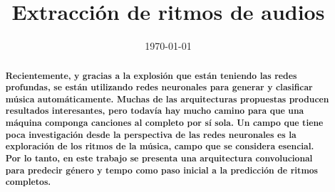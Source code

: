 \documentclass{etilo_tfm_iuta}  %
\begin{document}
\frontmatter
\title      {Extracción de ritmos de audios}
\date       {\today}
\subject    {}
\keywords   {}
\maketitle
\begin{abstract}
\bf \small	
Recientemente, y gracias a la explosión que están teniendo las redes profundas, se están utilizando redes neuronales para generar y clasificar música automáticamente. Muchas de las arquitecturas propuestas producen resultados interesantes, pero todavía hay mucho camino para que una máquina componga canciones al completo por sí sola. Un campo que tiene poca investigación desde la perspectiva de las redes neuronales es la exploración de los ritmos de la música, campo que se considera esencial. Por lo tanto, en este trabajo se presenta una arquitectura convolucional para predecir género y tempo como paso inicial a la predicción de ritmos completos.

\end{abstract}
\tableofcontents
\listoffigures
\listoftables


\mainmatter


\appendix

\backmatter

%

\end{document}
